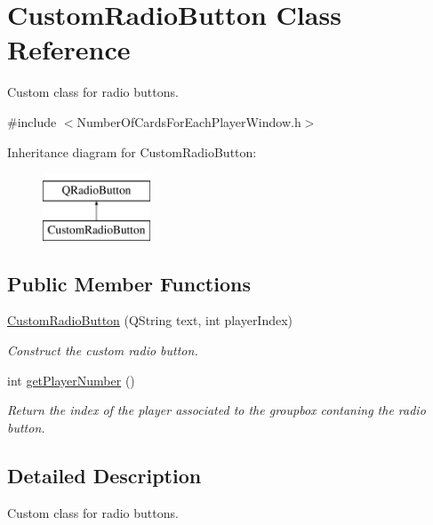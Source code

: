 \hypertarget{classCustomRadioButton}{}\section{Custom\+Radio\+Button Class Reference}
\label{classCustomRadioButton}


Custom class for radio buttons.  




{\ttfamily \#include $<$Number\+Of\+Cards\+For\+Each\+Player\+Window.\+h$>$}

Inheritance diagram for Custom\+Radio\+Button\+:\begin{figure}[H]
\begin{center}
\leavevmode
\includegraphics[height=2.000000cm]{classCustomRadioButton}
\end{center}
\end{figure}
\subsection*{Public Member Functions}
\begin{DoxyCompactItemize}
\item 
\hyperlink{classCustomRadioButton_a0868507b2cbd667b2788eddc38001bc4}{Custom\+Radio\+Button} (Q\+String text, int player\+Index)
\begin{DoxyCompactList}\small\item\em Construct the custom radio button. \end{DoxyCompactList}\item 
int \hyperlink{classCustomRadioButton_ad92a16634a48c1cc86cd3848c84accc9}{get\+Player\+Number} ()
\begin{DoxyCompactList}\small\item\em Return the index of the player associated to the groupbox contaning the radio button. \end{DoxyCompactList}\end{DoxyCompactItemize}


\subsection{Detailed Description}
Custom class for radio buttons. 

